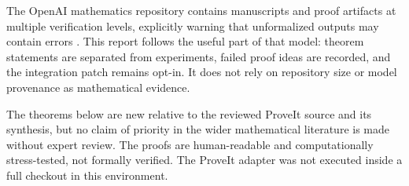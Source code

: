 The OpenAI mathematics repository contains manuscripts and proof artifacts at
multiple verification levels, explicitly warning that unformalized outputs may
contain errors \cite{OpenAIMath2026}.  This report follows the useful part of
that model: theorem statements are separated from experiments, failed proof
ideas are recorded, and the integration patch remains opt-in.  It does not rely
on repository size or model provenance as mathematical evidence.

\begin{warning}
The theorems below are new relative to the reviewed ProveIt source and its
synthesis, but no claim of priority in the wider mathematical literature is made
without expert review.  The proofs are human-readable and computationally
stress-tested, not formally verified.  The ProveIt adapter was not executed
inside a full checkout in this environment.
\end{warning}
